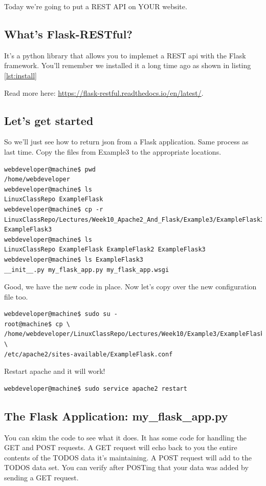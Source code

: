 \documentclass[10pt]{article}
\begin{document}
Today we're going to put a REST API on YOUR website.

\subsection{What's Flask-RESTful?}
It's a python library that allows you to implemet a REST api with the Flask
framework. You'll remember we installed it a long time ago as shown in listing
\ref{lst:install}

Read more here: \url{https://flask-restful.readthedocs.io/en/latest/}.

\subsection{Let's get started}
So we'll just see how to return json from a Flask application.
Same process as last time. Copy the files from Example3 to the appropriate
locations.

\begin{lstlisting}[style=term, caption=Deploying our third website]
webdeveloper@machine$ pwd
/home/webdeveloper
webdeveloper@machine$ ls
LinuxClassRepo ExampleFlask
webdeveloper@machine$ cp -r
LinuxClassRepo/Lectures/Week10_Apache2_And_Flask/Example3/ExampleFlask3
ExampleFlask3
webdeveloper@machine$ ls
LinuxClassRepo ExampleFlask ExampleFlask2 ExampleFlask3
webdeveloper@machine$ ls ExampleFlask3
__init__.py my_flask_app.py my_flask_app.wsgi
\end{lstlisting}

Good, we have the new code in place. Now let's copy over the new configuration
file too.

\begin{lstlisting}[style=term, caption=Get the configuration file for example 3]
webdeveloper@machine$ sudo su -
root@machine$ cp \
/home/webdeveloper/LinuxClassRepo/Lectures/Week10/Example3/ExampleFlask.conf \
/etc/apache2/sites-available/ExampleFlask.conf
\end{lstlisting}


Restart apache and it will work!

\begin{lstlisting}[style=term, caption=Restart the apache2 service.]
webdeveloper@machine$ sudo service apache2 restart
\end{lstlisting}


\subsection{The Flask Application: my\_flask\_app.py}
You can skim the code to see what it does. It has some code for handling the GET and POST requests. A GET request will echo back to you the entire contents of the TODOS data it's maintaining. A POST request will add to the TODOS data set. You can verify after POSTing that your data was added by sending a GET request.
\end{document}

